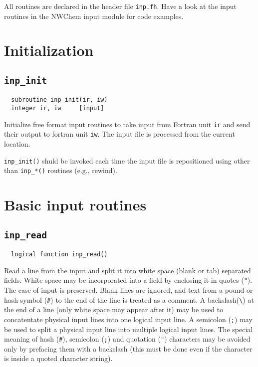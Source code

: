 

 All routines are declared in the header file {\tt inp.fh}.
Have a look at the input routines in the NWChem input module
for code examples.

\section{Initialization}

\subsection{{\tt inp\_init}}

\begin{verbatim}
  subroutine inp_init(ir, iw)
  integer ir, iw     [input]
\end{verbatim}
Initialize free format input routines to take input from Fortran unit
{\tt ir} and send their output to fortran unit {\tt iw}.  The input
file is processed from the current location.

{\tt inp\_init()} shuld be invoked each time the input file is
repositioned using other than {\tt inp\_*()} routines (e.g., rewind).

\section{Basic input routines}

\subsection{{\tt inp\_read}}
\begin{verbatim}
  logical function inp_read()
\end{verbatim}
Read a line from the input and split it into white space (blank or
tab) separated fields.  White space may be incorporated into a field
by enclosing it in quotes (\verb+"+).  The case of input is preserved.
Blank lines are ignored, and text from a pound or hash symbol
(\verb+#+) to the end of the line is treated as a comment.  A
backslash(\verb+\+) at the end of a line (only white space may appear
after it) may be used to concatentate physical input lines into one
logical input line.  A semicolon (\verb+;+) may be used to split a
physical input line into multiple logical input lines.  The special
meaning of hash (\verb+#+), semicolon (\verb+;+) and quotation
(\verb+"+) characters may be avoided only by prefacing them with a
backslash (this must be done even if the character is inside a quoted
character string).

